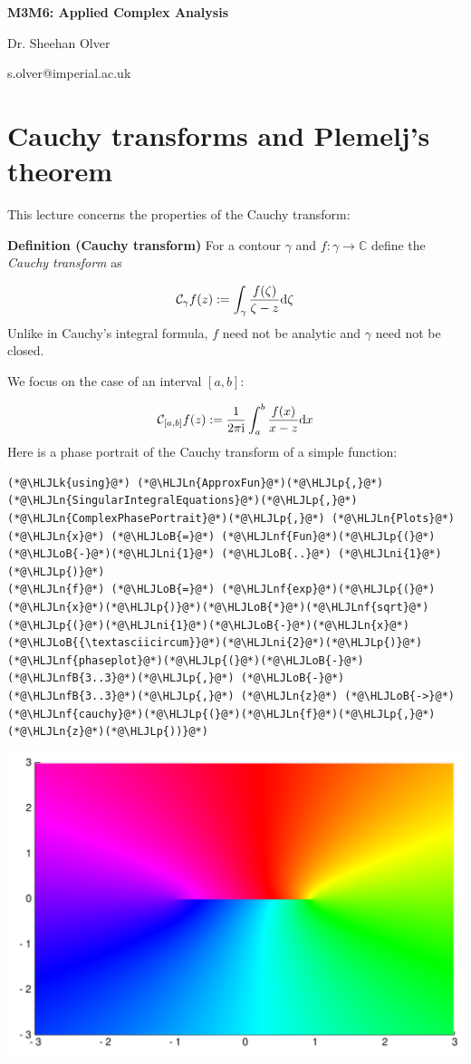 \documentclass[12pt,a4paper]{article}
\newcommand{\HLJLk}[1]{\textcolor[RGB]{148,91,176}{\textbf{#1}}}
\newcommand{\HLJLn}[1]{#1}
\newcommand{\HLJLnf}[1]{\textcolor[RGB]{66,102,213}{#1}}
\newcommand{\HLJLnfB}[1]{\textcolor[RGB]{59,151,46}{#1}}
\newcommand{\HLJLni}[1]{\textcolor[RGB]{59,151,46}{#1}}
\newcommand{\HLJLoB}[1]{\textcolor[RGB]{102,102,102}{\textbf{#1}}}
\newcommand{\HLJLp}[1]{#1}
\def\D{ {\rm d} }
\def\I{ {\rm i} }
\def\C{ {\mathbb C} }
\def\CC{ {\cal C} }
\def\dx{\D x}
\begin{document}
\textbf{M3M6: Applied Complex Analysis}

Dr. Sheehan Olver

s.olver@imperial.ac.uk

\section{Cauchy transforms and Plemelj's theorem}
This lecture concerns the properties of the Cauchy transform:

\textbf{Definition (Cauchy transform)} For a contour $\gamma$ and $f : \gamma \rightarrow \C$ define the \emph{Cauchy transform} as

\[
\CC_\gamma f(z) := \int_\gamma {f(\zeta) \over \zeta - z} \D \zeta
\]
Unlike in Cauchy's integral formula, $f$ need not be analytic and $\gamma$ need not be closed.

We focus on the case of an interval $[a,b]$:

\[
\CC_{[a,b]} f(z) := {1 \over 2 \pi \I} \int_a^b {f(x) \over x - z} \dx
\]
Here is a phase portrait of the Cauchy transform of a simple function:


\begin{lstlisting}
(*@\HLJLk{using}@*) (*@\HLJLn{ApproxFun}@*)(*@\HLJLp{,}@*) (*@\HLJLn{SingularIntegralEquations}@*)(*@\HLJLp{,}@*) (*@\HLJLn{ComplexPhasePortrait}@*)(*@\HLJLp{,}@*) (*@\HLJLn{Plots}@*)
(*@\HLJLn{x}@*) (*@\HLJLoB{=}@*) (*@\HLJLnf{Fun}@*)(*@\HLJLp{(}@*)(*@\HLJLoB{-}@*)(*@\HLJLni{1}@*) (*@\HLJLoB{..}@*) (*@\HLJLni{1}@*)(*@\HLJLp{)}@*)
(*@\HLJLn{f}@*) (*@\HLJLoB{=}@*) (*@\HLJLnf{exp}@*)(*@\HLJLp{(}@*)(*@\HLJLn{x}@*)(*@\HLJLp{)}@*)(*@\HLJLoB{*}@*)(*@\HLJLnf{sqrt}@*)(*@\HLJLp{(}@*)(*@\HLJLni{1}@*)(*@\HLJLoB{-}@*)(*@\HLJLn{x}@*)(*@\HLJLoB{{\textasciicircum}}@*)(*@\HLJLni{2}@*)(*@\HLJLp{)}@*)
(*@\HLJLnf{phaseplot}@*)(*@\HLJLp{(}@*)(*@\HLJLoB{-}@*)(*@\HLJLnfB{3..3}@*)(*@\HLJLp{,}@*) (*@\HLJLoB{-}@*)(*@\HLJLnfB{3..3}@*)(*@\HLJLp{,}@*) (*@\HLJLn{z}@*) (*@\HLJLoB{->}@*) (*@\HLJLnf{cauchy}@*)(*@\HLJLp{(}@*)(*@\HLJLn{f}@*)(*@\HLJLp{,}@*)(*@\HLJLn{z}@*)(*@\HLJLp{))}@*)
\end{lstlisting}

\includegraphics[width=\linewidth]{figures/Lecture12_1_1.pdf}
\end{document}
